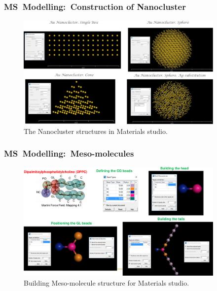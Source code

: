 \frame
{
	\frametitle{\textrm{MS~Modelling:~Construction of Nanocluster}}
\begin{figure}[h!]
\centering
\vspace*{-0.10in}
\includegraphics[height=2.20in,width=4.00in,viewport=0 0 1292 707,clip]{Figures/MS-Building_Nanocluster-examples.png}
\caption{\tiny \textrm{The Nanocluster structures in Materials studio.}}%
\label{MS-Building_Nanocluster-examples}
\end{figure}
}

\frame
{
	\frametitle{\textrm{MS~Modelling:~Meso-molecules}}
\begin{figure}[h!]
\centering
\vspace*{-0.12in}
\includegraphics[height=2.31in,width=4.00in,viewport=0 0 1275 735,clip]{Figures/MS-Building_Mesomolecule.png}
\caption{\tiny \textrm{Building Meso-molecule structure for Materials studio.}}%
\label{MS-Building_Meso-molecules}
\end{figure}
}

